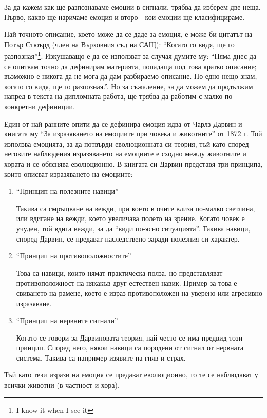 \documentclass[main.tex]{subfiles}
\begin{document}
За да кажем как ще разпознаваме емоции в сигнали, трябва да изберем две неща. Първо, какво ще наричаме емоция и второ - кои емоции ще класифицираме.

Най-точното описание, което може да се даде за емоция, е може би цитатът на Потър Стюърд (член на Върховния съд на САЩ):  ``Когато го видя, ще го разпозная''\footnote{I know it when I see it}. Изкушаващо е да се използват за случая думите му: ``Няма днес да се опитвам точно да дефинирам материята, попадаща под това кратко описание; възможно е никога да не мога да дам разбираемо описание. Но едно нещо знам, когато го видя, ще го разпозная.''. Но за съжаление, за да можем да продължим напред в текста на дипломната работа, ще трябва да работим с малко по-конкретни дефиниции.

Един от най-ранните опити да се дефинира емоция идва от Чарлз Дарвин и книгата му ``За изразяването на емоциите при човека и животните'' от 1872 г. 
Той използва емоцията, за да потвърди еволюционната си теория, тъй като според неговите наблюдения изразяването на емоциите е сходно между животните и хората и се обяснява еволюционно. В книгата си Дарвин представя три принципа, които описват изразяването на емоциите:
\begin{enumerate}
    \item ``Принцип на полезните навици''
    
    Такива са смръщване на вежди, при което в очите влиза по-малко светлина, или вдигане на вежди, което увеличава полето на зрение. Когато човек е учуден, той вдига вежди, за да ``види по-ясно ситуацията''. Такива навици, според Дарвин, се предават наследствено заради полезния си характер.
    \item ``Принцип на противоположностите''
    
    Това са навици, които нямат практическа полза, но представляват противоположност на някакъв друг естествен навик. Пример за това е свиването на рамене, което е израз противоположен на уверено или агресивно изразяване.
    
    \item ``Принцип на нервните сигнали''
    
    Когато се говори за Дарвиновата теория, най-често се има предвид този принцип. Според него, някои навици са породени от сигнал от нервната система. Такива са например изявите на гняв и страх.
\end{enumerate}

Тъй като тези изрази на емоция се предават еволюционно, то те се наблюдават у всички животни (в частност и хора). 
\end{document}

